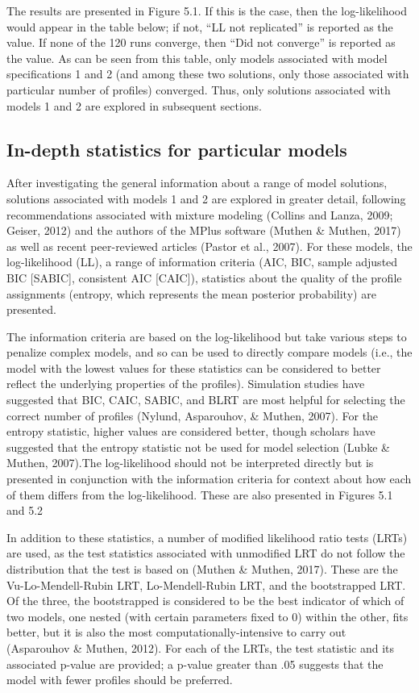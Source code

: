 \documentclass[]{book}
\theoremstyle{definition}
\theoremstyle{definition}
\theoremstyle{definition}
\theoremstyle{remark}
\begin{document}
The results are presented in Figure 5.1. If this is the case, then the
log-likelihood would appear in the table below; if not, ``LL not
replicated'' is reported as the value. If none of the 120 runs converge,
then ``Did not converge'' is reported as the value. As can be seen from
this table, only models associated with model specifications 1 and 2
(and among these two solutions, only those associated with particular
number of profiles) converged. Thus, only solutions associated with
models 1 and 2 are explored in subsequent sections.

\subsection{In-depth statistics for particular
models}\label{in-depth-statistics-for-particular-models}

After investigating the general information about a range of model
solutions, solutions associated with models 1 and 2 are explored in
greater detail, following recommendations associated with mixture
modeling (Collins and Lanza, 2009; Geiser, 2012) and the authors of the
MPlus software (Muthen \& Muthen, 2017) as well as recent peer-reviewed
articles (Pastor et al., 2007). For these models, the log-likelihood
(LL), a range of information criteria (AIC, BIC, sample adjusted BIC
{[}SABIC{]}, consistent AIC {[}CAIC{]}), statistics about the quality of
the profile assignments (entropy, which represents the mean posterior
probability) are presented.

The information criteria are based on the log-likelihood but take
various steps to penalize complex models, and so can be used to directly
compare models (i.e., the model with the lowest values for these
statistics can be considered to better reflect the underlying properties
of the profiles). Simulation studies have suggested that BIC, CAIC,
SABIC, and BLRT are most helpful for selecting the correct number of
profiles (Nylund, Asparouhov, \& Muthen, 2007). For the entropy
statistic, higher values are considered better, though scholars have
suggested that the entropy statistic not be used for model selection
(Lubke \& Muthen, 2007).The log-likelihood should not be interpreted
directly but is presented in conjunction with the information criteria
for context about how each of them differs from the log-likelihood.
These are also presented in Figures 5.1 and 5.2

In addition to these statistics, a number of modified likelihood ratio
tests (LRTs) are used, as the test statistics associated with unmodified
LRT do not follow the distribution that the test is based on (Muthen \&
Muthen, 2017). These are the Vu-Lo-Mendell-Rubin LRT, Lo-Mendell-Rubin
LRT, and the bootstrapped LRT. Of the three, the bootstrapped is
considered to be the best indicator of which of two models, one nested
(with certain parameters fixed to 0) within the other, fits better, but
it is also the most computationally-intensive to carry out (Asparouhov
\& Muthen, 2012). For each of the LRTs, the test statistic and its
associated p-value are provided; a p-value greater than .05 suggests
that the model with fewer profiles should be preferred.
\end{document}
